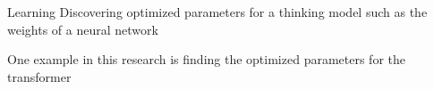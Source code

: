 \begin{frame}{Learning}
    Discovering optimized parameters for a thinking model such as the weights of a neural network
    
    One example in this research is finding the optimized parameters for the transformer
\end{frame}